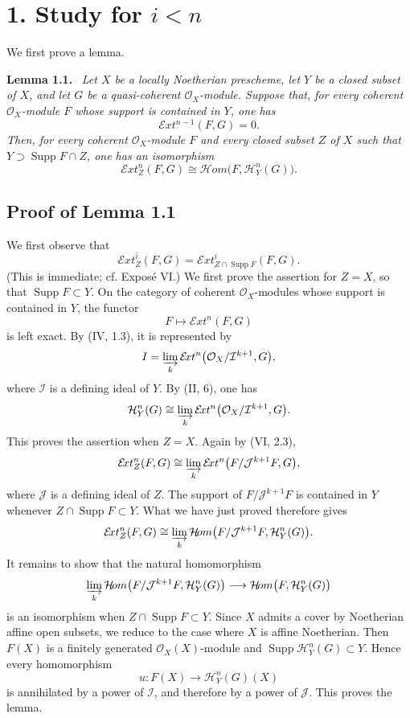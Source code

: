 \documentclass[11pt,a4paper]{article}
\newcommand{\OX}{\mathcal O_X}
\newcommand{\SheafExt}{\mathcal E\!xt}
\newcommand{\SheafHom}{\mathcal H\!om}
\newcommand{\SheafH}{\mathcal H}
\newcommand{\Supp}{\operatorname{Supp}}
\newenvironment{sgastatement}[1]{\par\addvspace{0.8\baselineskip}\noindent\textbf{#1.}\ \itshape}{\par}
\begin{document}
\section*{1. Study for $i<n$}

We first prove a lemma.

\begin{sgastatement}{Lemma 1.1}
Let $X$ be a locally Noetherian prescheme, let $Y$ be a closed subset of $X$,
and let $G$ be a quasi-coherent $\OX$-module. Suppose that, for every coherent
$\OX$-module $F$ whose support is contained in $Y$, one has
\[
  \SheafExt^{n-1}(F,G)=0.
\]
Then, for every coherent $\OX$-module $F$ and every closed subset $Z$ of $X$
such that $Y\supset\Supp F\cap Z$, one has an isomorphism
\[
  \SheafExt_Z^n(F,G)\cong
  \SheafHom\bigl(F,\SheafH_Y^n(G)\bigr).
\]
\end{sgastatement}

\subsection*{Proof of Lemma 1.1}

We first observe that
\[
  \SheafExt_Z^i(F,G)
  =\SheafExt_{Z\cap\Supp F}^i(F,G).
\]
(This is immediate; cf. Expos\'e VI.) We first prove the assertion for
$Z=X$, so that $\Supp F\subset Y$. On the category of coherent $\OX$-modules
whose support is contained in $Y$, the functor
\[
  F\longmapsto\SheafExt^n(F,G)
\]
is left exact. By (IV, 1.3), it is represented by
\[
  I=\varinjlim_k\SheafExt^n
    \bigl(\OX/\mathcal I^{k+1},G\bigr),
\]
where $\mathcal I$ is a defining ideal of $Y$. By (II, 6), one has
\[
  \SheafH_Y^n(G)\cong
  \varinjlim_k\SheafExt^n
    \bigl(\OX/\mathcal I^{k+1},G\bigr).
\]
This proves the assertion when $Z=X$. Again by (VI, 2.3),
\[
  \SheafExt_Z^n(F,G)\cong
  \varinjlim_k\SheafExt^n
    \bigl(F/\mathcal J^{k+1}F,G\bigr),
\]
where $\mathcal J$ is a defining ideal of $Z$. The support of
$F/\mathcal J^{k+1}F$ is contained in $Y$ whenever
$Z\cap\Supp F\subset Y$. What we have just proved therefore gives
\[
  \SheafExt_Z^n(F,G)\cong
  \varinjlim_k\SheafHom
    \bigl(F/\mathcal J^{k+1}F,\SheafH_Y^n(G)\bigr).
\]
It remains to show that the natural homomorphism
\[
  \varinjlim_k\SheafHom
    \bigl(F/\mathcal J^{k+1}F,\SheafH_Y^n(G)\bigr)
  \longrightarrow
  \SheafHom\bigl(F,\SheafH_Y^n(G)\bigr)
\]
is an isomorphism when $Z\cap\Supp F\subset Y$. Since $X$ admits a cover by
Noetherian affine open subsets, we reduce to the case where $X$ is affine
Noetherian. Then $F(X)$ is a finitely generated $\OX(X)$-module and
$\Supp\SheafH_Y^n(G)\subset Y$. Hence every homomorphism
\[
  u:F(X)\longrightarrow\SheafH_Y^n(G)(X)
\]
is annihilated by a power of $\mathcal I$, and therefore by a power of
$\mathcal J$. This proves the lemma.
\end{document}
